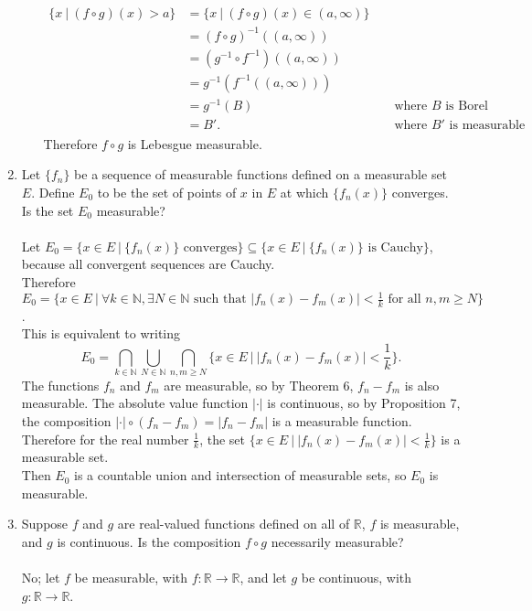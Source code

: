 \begin{enumerate}
\begin{enumerate}[label=(\roman*),align=left]
        \begin{align*}
            \{x\ |\ (f\circ g )(x)>a\}&=\{x\ |\ (f\circ g )(x)\in(a,\infty)\}\\
            &=(f\circ g )^{-1}((a,\infty))\\
            &=(g^{-1}\circ f^{-1})((a,\infty))\\
            &=g^{-1}(f^{-1}((a,\infty)))\\
            &=g^{-1}(B)&&\text{ where }B\text{ is Borel}\\
            &=B'.&&\text{ where }B'\text{ is measurable (Problem 7)}
        \end{align*}
        Therefore $f\circ g$ is Lebesgue measurable.
    \end{enumerate}
    \item Let $\{f_n\}$ be a sequence of measurable functions defined on a measurable set $E$.
    Define $E_0$ to be the set of points of $x$ in $E$ at which $\{f_n(x)\}$ converges. Is the set $E_0$ measurable?\\
    \\Let $E_0=\{x\in E\ |\ \{f_n(x)\}\text{ converges}\}\subseteq \{x\in E\ |\ \{f_n(x)\}\text{ is Cauchy}\}$, because all convergent sequences are Cauchy.
    \\Therefore $E_0=\{x\in E\ |\ \forall k\in\mathbb{N},\exists N\in\mathbb{N}\text{ such that }|f_n(x)-f_m(x)|<\frac{1}{k}\text{ for all }n,m\ge N\}$.
    \\This is equivalent to writing 
    \[
        E_0=\bigcap_{k\in\mathbb{N}}\bigcup_{N\in\mathbb{N}}\bigcap_{n,m\ge N}\{x\in E\ |\ |f_n(x)-f_m(x)|<\frac{1}{k}\}.
    \]
    The functions $f_n$ and $f_m$ are measurable, so by Theorem 6, $f_n-f_m$ is also measurable.
    The absolute value function $|\cdot|$ is continuous, so by Proposition 7, the composition $|\cdot|\circ(f_n-f_m)=|f_n-f_m|$ is a measurable function.
    Therefore for the real number $\frac{1}{k}$, the set $\{x\in E\ |\ |f_n(x)-f_m(x)|<\frac{1}{k}\}$ is a measurable set.\\
    Then $E_0$ is a countable union and intersection of measurable sets, so $E_0$ is measurable.
    \item Suppose $f$ and $g$ are real-valued functions defined on all of $\mathbb{R}$, $f$ is measurable, and $g$ is continuous.
    Is the composition $f\circ g$ necessarily measurable?\\
    \\No; let $f$ be measurable, with $f:\mathbb{R}\to\mathbb{R}$, and let $g$ be continuous, with $g:\mathbb{R}\to \mathbb{R}$.

\end{enumerate}
